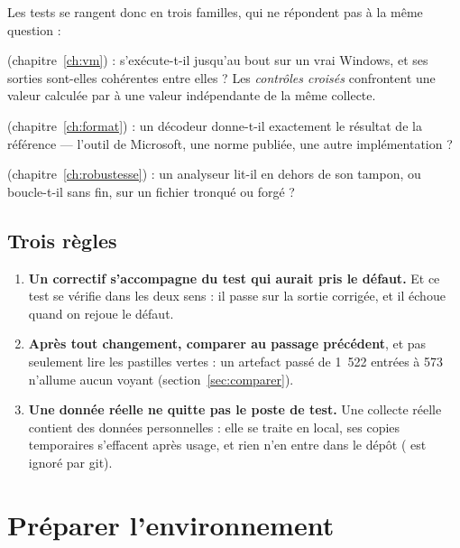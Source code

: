 \documentclass[11pt,a4paper,oneside]{report}
\begin{document}
Les tests se rangent donc en trois familles, qui ne répondent pas à la même
question :

\begin{description}[leftmargin=0pt,itemsep=0.5em]
  \item[Le cycle dans la machine virtuelle] (chapitre~\ref{ch:vm}) :
    \wac{} s'exécute-t-il jusqu'au bout sur un vrai Windows, et ses sorties
    sont-elles cohérentes entre elles ? Les \emph{contrôles croisés}
    confrontent une valeur calculée par \wac{} à une valeur indépendante de la
    même collecte.
  \item[Les harnais de format] (chapitre~\ref{ch:format}) : un décodeur
    donne-t-il exactement le résultat de la référence — l'outil de Microsoft,
    une norme publiée, une autre implémentation ?
  \item[Les harnais de robustesse] (chapitre~\ref{ch:robustesse}) : un
    analyseur lit-il en dehors de son tampon, ou boucle-t-il sans fin, sur un
    fichier tronqué ou forgé ?
\end{description}

\section{Trois règles}

\begin{enumerate}
  \item \textbf{Un correctif s'accompagne du test qui aurait pris le défaut.}
    Et ce test se vérifie dans les deux sens : il passe sur la sortie
    corrigée, et il échoue quand on rejoue le défaut.
  \item \textbf{Après tout changement, comparer au passage précédent}, et pas
    seulement lire les pastilles vertes : un artefact passé de 1~522 entrées à
    573 n'allume aucun voyant (section~\ref{sec:comparer}).
  \item \textbf{Une donnée réelle ne quitte pas le poste de test.} Une collecte
    réelle contient des données personnelles : elle se traite en local, ses
    copies temporaires s'effacent après usage, et rien n'en entre dans le dépôt
    ( est ignoré par git).
\end{enumerate}

\chapter{Préparer l'environnement}
\end{document}
